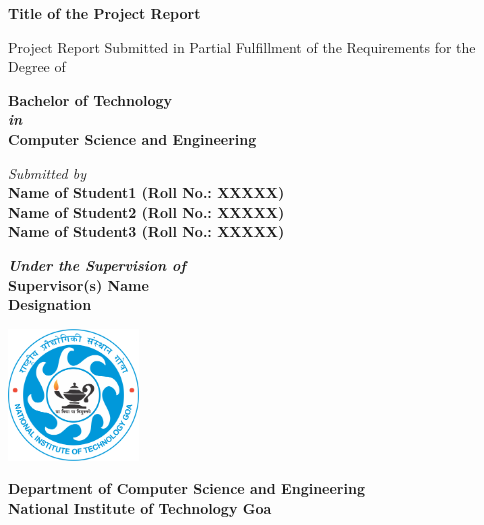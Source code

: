 \documentclass[a4paper,12pt]{report}
\begin{document}
\begin{titlepage}
\begin{center}
       
       \Large {\textbf{Title of the Project Report}
}
        
     \vspace{0.2cm}
     {\footnotesize Project Report Submitted in Partial Fulfillment of the Requirements for the Degree of}\\
     \vspace{0.2cm}
   
    
     \textbf{\Large Bachelor of Technology}\\
 
        \textbf{\textit{in}}\\
           \textbf{\Large Computer Science and Engineering}
           
           \vspace{1cm}
           
           \textit{Submitted by}\\
        \textbf{\large Name of Student1 (Roll No.: XXXXX)}\\
         \textbf{\large Name of Student2 (Roll No.: XXXXX)}\\
          \textbf{\large Name of Student3 (Roll No.: XXXXX)}
        \vspace{1cm}
                
        \centering \large \textbf{\textit{Under the Supervision of}}\\
        \textbf{\large Supervisor(s) Name}\\
         \centering\textbf{Designation}
         \vspace{0.5cm}
     
      \includegraphics[width=0.26\textwidth]{images/NIT_Goa_Logo.png}\\
        \vspace{0.2cm}
        
       \textbf{Department of Computer Science and Engineering}\\
       \vspace{0.1cm}
        \textbf{National Institute of Technology Goa}\\
       \vspace{0.3cm} 
 
        \textbf{}
    \end{center} 
\end{titlepage}
\end{document}
